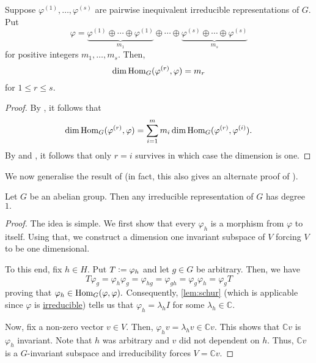 \begin{cor} \label{cor:extractmultiplicitywithhom}
	Suppose $\varphi^{(1)}, \ldots, \varphi^{(s)}$ are pairwise inequivalent irreducible representations of $G.$ Put
	\begin{equation*} 
		\varphi = \underbrace{\varphi^{(1)} \oplus \cdots \oplus \varphi^{(1)}}_{m_1} \oplus \cdots \oplus \underbrace{\varphi^{(s)} \oplus \cdots \oplus \varphi^{(s)}}_{m_s}
	\end{equation*}
	for positive integers $m_1, \ldots, m_s.$ Then, 
	\begin{equation*} 
		\dim\operatorname{Hom}_{G}(\varphi^{(r)}, \varphi) = m_r
	\end{equation*}
	for $1 \le r \le s.$
\end{cor}
\begin{proof} 
	By , it follows that
	\begin{equation*} 
		\dim\operatorname{Hom}_{G}(\varphi^{(r)}, \varphi) = \sum_{i = 1}^{m}m_i\dim\operatorname{Hom}_{G}(\varphi^{(r)}, \varphi^{(i)}).
	\end{equation*}
	By  and , it follows that only $r = i$ survives in which case the dimension is one.
\end{proof}

We now generalise the result of  (in fact, this also gives an alternate proof of ).

\begin{thm} \label{thm:irredabelgroup}
	Let $G$ be an abelian group. Then any irreducible representation of $G$ has degree $1.$
\end{thm}
\begin{proof} 
	The idea is simple. We first show that every $\varphi_h$ is a morphism from $\varphi$ to itself. Using that, we construct a dimension one invariant subspace of $V$ forcing $V$ to be one dimensional.

	To this end, fix $h \in H.$ Put $T \vcentcolon= \varphi_h$ and let $g \in G$ be arbitrary. Then, we have
	\begin{equation*} 
		T\varphi_g = \varphi_h\varphi_g = \varphi_{hg} = \varphi_{gh} = \varphi_g\varphi_h = \varphi_gT
	\end{equation*}
	proving that $\varphi_h \in \operatorname{Hom}_{G}(\varphi, \varphi).$ Consequently, \autoref{lem:schur} (which is applicable since $\varphi$ is \underline{irreducible}) tells us that $\varphi_h = \lambda_h I$ for some $\lambda_h \in \mathbb{C}.$ 

	Now, fix a non-zero vector $v \in V.$ Then, $\varphi_hv = \lambda_hv \in \mathbb{C}v.$ This shows that $\mathbb{C}v$ is $\varphi_h$ invariant. Note that $h$ was arbitrary and $v$ did not dependent on $h.$ Thus, $\mathbb{C}v$ is a $G$-invariant subspace and irreducibility forces $V = \mathbb{C}v.$
\end{proof}

